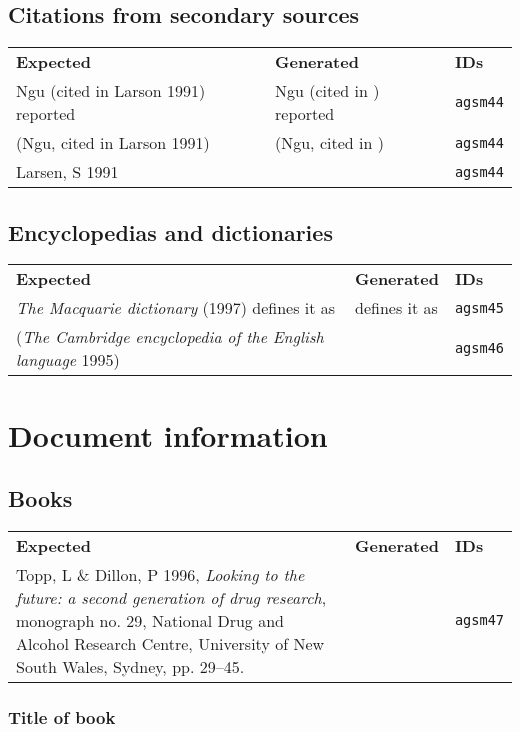\documentclass[a4paper,landscape,12pt]{article}
\newlength\q
\newlength\qr
\newenvironment{citetable}
  {\noindent\begin{longtable}{p{\q} p{\q} p{\qr}}\textbf{Expected} & \textbf{Generated} & \textbf{IDs}\\}
  {\end{longtable}}
\begin{document}
\subsection{Citations from secondary sources}

\begin{citetable}
	Ngu (cited in Larson 1991) reported & Ngu (cited in \cite{agsm44}) reported & \texttt{agsm44} \\
	(Ngu, cited in Larson 1991) & (Ngu, cited in \cite{agsm44}) & \texttt{agsm44} \\
	Larsen, S 1991 & \fullcite{agsm44} & \texttt{agsm44} \\
\end{citetable}

\subsection{Encyclopedias and dictionaries}

\begin{citetable}
	\textit{The Macquarie dictionary} (1997) defines it as & \textcite{agsm45} defines it as & \texttt{agsm45} \\
	(\textit{The Cambridge encyclopedia of the English language} 1995) & \parencite{agsm46} & \texttt{agsm46} \\
\end{citetable}

\section{Document information}

\subsection{Books}

\begin{citetable}
	Topp, L \& Dillon, P 1996, \textit{Looking to the future: a second generation of drug research}, monograph no. 29, National Drug and Alcohol Research Centre, University of New South Wales, Sydney, pp. 29--45. & \fullcite{agsm47} & \texttt{agsm47} \\
\end{citetable}

\subsubsection{Title of book}
\end{document}
